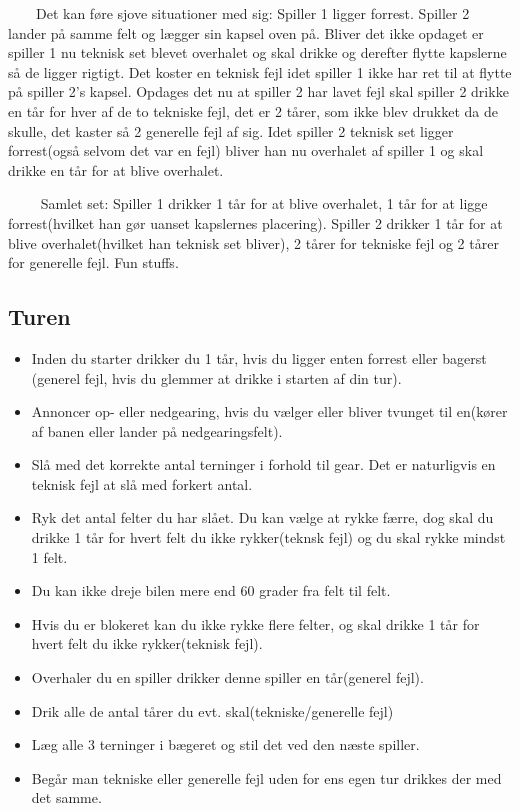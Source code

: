 \documentclass[12pt]{article}
\begin{document}
$\qquad$Det kan føre sjove situationer med sig: Spiller 1 ligger forrest. Spiller 2 lander på samme felt og lægger sin kapsel oven på. Bliver det ikke opdaget er spiller 1 nu teknisk set blevet overhalet og skal drikke og derefter flytte kapslerne så de ligger rigtigt. Det koster en teknisk fejl idet spiller 1 ikke har ret til at flytte på spiller 2's kapsel. Opdages det nu at spiller 2 har lavet fejl skal spiller 2 drikke en tår for hver af de to tekniske fejl, det er 2 tårer, som ikke blev drukket da de skulle, det kaster så 2 generelle fejl af sig. Idet spiller 2 teknisk set ligger forrest(også selvom det var en fejl) bliver han nu overhalet af spiller 1 og skal drikke en tår for at blive overhalet.

$\qquad$ Samlet set: Spiller 1 drikker 1 tår for at blive overhalet, 1 tår for at ligge forrest(hvilket han gør uanset kapslernes placering).
Spiller 2 drikker 1 tår for at blive overhalet(hvilket han teknisk set bliver), 2 tårer for tekniske fejl og 2 tårer for generelle fejl.
Fun stuffs.


\subsection*{Turen}

\begin{itemize}
	\item Inden du starter drikker du 1 tår, hvis du ligger enten forrest eller bagerst (generel fejl, hvis du glemmer at drikke i starten af din tur).
	\item Annoncer op- eller nedgearing, hvis du vælger eller bliver tvunget til en(kører af banen eller lander på nedgearingsfelt).
	\item Slå med det korrekte antal terninger i forhold til gear. Det er naturligvis en teknisk fejl at slå med forkert antal.
	\item Ryk det antal felter du har slået. Du kan vælge at rykke færre, dog skal du drikke 1 tår for hvert felt du ikke rykker(teknsk fejl) og du skal rykke mindst 1 felt.
	\item Du kan ikke dreje bilen mere end 60 grader fra felt til felt.
	\item Hvis du er blokeret kan du ikke rykke flere felter, og skal drikke 1 tår for hvert felt du ikke rykker(teknisk fejl).
	\item Overhaler du en spiller drikker denne spiller en tår(generel fejl).
	\item Drik alle de antal tårer du evt. skal(tekniske/generelle fejl)
	\item Læg alle 3 terninger i bægeret og stil det ved den næste spiller.
	\item Begår man tekniske eller generelle fejl uden for ens egen tur drikkes der med det samme.
\end{itemize}
\end{document}
